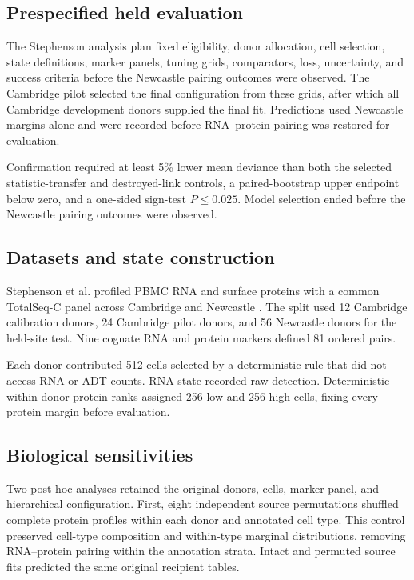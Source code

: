 \documentclass[pdflatex,sn-vancouver-num,iicol]{sn-jnl}
\begin{document}
\subsection{Prespecified held evaluation}

The Stephenson analysis plan fixed eligibility, donor allocation, cell selection, state definitions, marker panels, tuning grids, comparators, loss, uncertainty, and success criteria before the Newcastle pairing outcomes were observed. The Cambridge pilot selected the final configuration from these grids, after which all Cambridge development donors supplied the final fit. Predictions used Newcastle margins alone and were recorded before RNA--protein pairing was restored for evaluation.

Confirmation required at least 5\% lower mean deviance than both the selected statistic-transfer and destroyed-link controls, a paired-bootstrap upper endpoint below zero, and a one-sided sign-test $P\leq0.025$. Model selection ended before the Newcastle pairing outcomes were observed.

\subsection{Datasets and state construction}

Stephenson et al. profiled PBMC RNA and surface proteins with a common TotalSeq-C panel across Cambridge and Newcastle \cite{stephenson2021}. The split used 12 Cambridge calibration donors, 24 Cambridge pilot donors, and 56 Newcastle donors for the held-site test. Nine cognate RNA and protein markers defined 81 ordered pairs.

Each donor contributed 512 cells selected by a deterministic rule that did not access RNA or ADT counts. RNA state recorded raw detection. Deterministic within-donor protein ranks assigned 256 low and 256 high cells, fixing every protein margin before evaluation.

\subsection{Biological sensitivities}

Two post hoc analyses retained the original donors, cells, marker panel, and hierarchical configuration. First, eight independent source permutations shuffled complete protein profiles within each donor and annotated cell type. This control preserved cell-type composition and within-type marginal distributions, removing RNA--protein pairing within the annotation strata. Intact and permuted source fits predicted the same original recipient tables.
\end{document}
